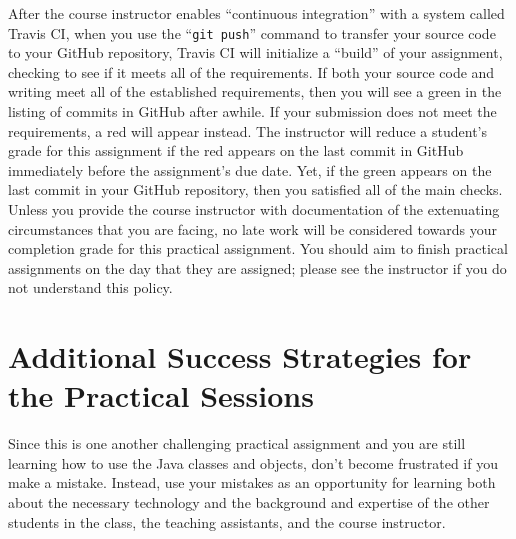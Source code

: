 \documentclass[11pt]{article}
\newcommand{\gitpush}{\command{git push}}
\newcommand{\command}[1]{``\lstinline{#1}''}
\newcommand{\step}[1]{``{#1}''}
\newcommand{\checkmark}{\ding{51}}
\newcommand{\naughtmark}{\ding{55}}
\begin{document}
After the course instructor enables \step{continuous integration} with a system called Travis CI, when you use the
\gitpush{} command to transfer your source code to your GitHub repository, Travis CI will initialize a \step{build} of
your assignment, checking to see if it meets all of the requirements. If both your source code and writing meet all of
the established requirements, then you will see a green \checkmark{} in the listing of commits in GitHub after awhile.
If your submission does not meet the requirements, a red \naughtmark{} will appear instead. The instructor will reduce a
student's grade for this assignment if the red \naughtmark{} appears on the last commit in GitHub immediately before the
assignment's due date. Yet, if the green \checkmark{} appears on the last commit in your GitHub repository, then you
satisfied all of the main checks. Unless you provide the course instructor with documentation of the extenuating
circumstances that you are facing, no late work will be considered towards your completion grade for this practical
assignment. You should aim to finish practical assignments on the day that they are assigned; please see the instructor
if you do not understand this policy.

\section*{Additional Success Strategies for the Practical Sessions}

Since this is one another challenging practical assignment and you are still learning how to use the Java classes and
objects, don't become frustrated if you make a mistake. Instead, use your mistakes as an opportunity for learning both
about the necessary technology and the background and expertise of the other students in the class, the teaching
assistants, and the course instructor.
\end{document}
